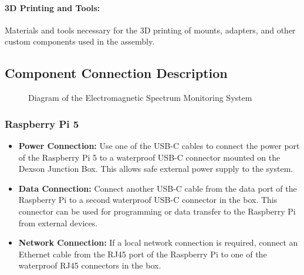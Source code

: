 \documentclass{article}
\begin{document}
\paragraph{3D Printing and Tools:} Materials and tools necessary for the 3D printing of mounts, adapters, and other custom components used in the assembly.




\subsection{Component Connection Description}

\begin{figure}[h!]
    \centering
    
    \caption{Diagram of the Electromagnetic Spectrum Monitoring System}
    \label{fig:blocks}
\end{figure}


\subsubsection{Raspberry Pi 5}
\begin{itemize}
    \item \textbf{Power Connection:} Use one of the USB-C cables to connect the power port of the Raspberry Pi 5 to a waterproof USB-C connector mounted on the Dexson Junction Box. This allows safe external power supply to the system.
    \item \textbf{Data Connection:} Connect another USB-C cable from the data port of the Raspberry Pi to a second waterproof USB-C connector in the box. This connector can be used for programming or data transfer to the Raspberry Pi from external devices.
    \item \textbf{Network Connection:} If a local network connection is required, connect an Ethernet cable from the RJ45 port of the Raspberry Pi to one of the waterproof RJ45 connectors in the box.
\end{itemize}
\end{document}
